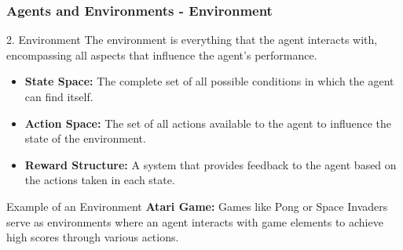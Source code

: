 \documentclass[aspectratio=169]{beamer}
\begin{document}
\begin{frame}[fragile]
    \frametitle{Agents and Environments - Environment}
    
    \begin{block}{2. Environment}
        The environment is everything that the agent interacts with, encompassing all aspects that influence the agent’s performance. 
    \end{block}
    
    \begin{itemize}
        \item \textbf{State Space:} The complete set of all possible conditions in which the agent can find itself.
        \item \textbf{Action Space:} The set of all actions available to the agent to influence the state of the environment.
        \item \textbf{Reward Structure:} A system that provides feedback to the agent based on the actions taken in each state.
    \end{itemize}
    
    \begin{block}{Example of an Environment}
        \textbf{Atari Game:} Games like Pong or Space Invaders serve as environments where an agent interacts with game elements to achieve high scores through various actions.
    \end{block}
\end{frame}
\end{document}
